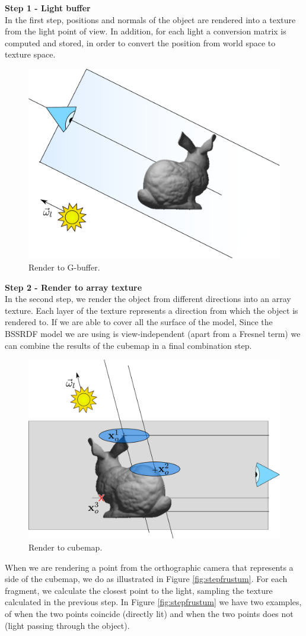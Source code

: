 \textbf{Step 1 - Light buffer} \\
In the first step, positions and normals of the object are rendered into a texture from the light point of view. In addition, for each light a conversion matrix is computed and stored, in order to convert the position from world space to texture space. 

\begin{figure}[!ht]
\centering
\includegraphics[width=0.5 \linewidth]{images/method/step1}
\caption{Render to G-buffer.}
\label{fig:step1}
\end{figure} 


\textbf{Step 2 - Render to array texture} \\
In the second step, we render the object from different directions into an array texture. Each layer of the texture represents a direction from which the object is rendered to. If we are able to cover all the surface of the model, 
Since the BSSRDF model we are using is view-independent (apart from a Fresnel term) we can combine the results of the cubemap in a final combination step.

\begin{figure}[!ht]
\centering
\includegraphics[width=0.5 \linewidth]{images/method/step2}
\caption{Render to cubemap.}
\label{fig:step2}
\end{figure} 

When we are rendering a point from the orthographic camera that represents a side of the cubemap, we do as illustrated in Figure \ref{fig:stepfrustum}. For each fragment, we calculate the closest point to the light, sampling the texture calculated in the previous step. In Figure  \ref{fig:stepfrustum} we have two examples, of when the two points coincide (directly lit) and when the two points does not (light passing through the object). 

